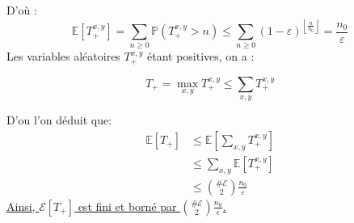 \documentclass[a4paper,11pt]{article}
\def \P{\mathbb{P}}
\def \E{\mathcal{E}}
\def \esp{\mathbb{E}}
\begin{document}
D'où : 
\[ \esp[T_+^{x,y}]  = \sum_{n\geq 0} \P(T_+^{x,y}>n) \le  \sum_{n\geq 0} (1-\varepsilon)^{\left\lfloor\frac{n}{n_0}\right\rfloor} = \frac{n_0}{\varepsilon} \] 
Les variables aléatoires $T_+^{x,y}$ étant positives, on a :

\[ T_+ = \max_{x,y}  T_+^{x,y} \le \sum_{x,y} T_+^{x,y} \] 

D'ou l'on déduit que:
\begin{equation*}
\begin{split}
\mathbb{E}[T_+] & \le \esp[\sum_{x,y} T_+^{x,y}] \\
		& \le \sum_{x,y} \esp[T_+^{x,y}]  \\
		& \le \binom{\# \E}{2} \frac{n_0}{\varepsilon} 
\end{split}
\end{equation*}
\underline{Ainsi, $\E[T_+]$ est fini et borné par $\binom{\# \E}{2} \frac{n_0}{\epsilon}$.}
\end{document}
